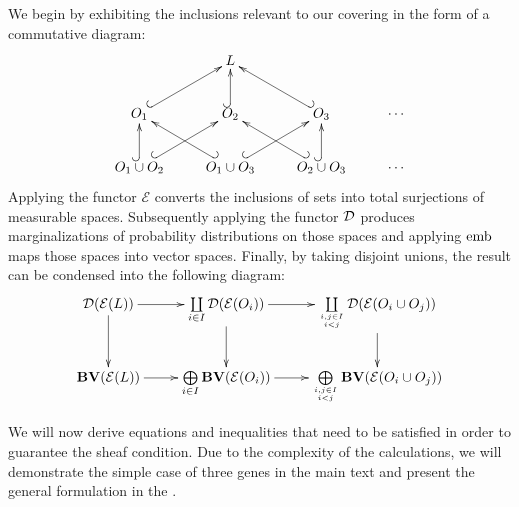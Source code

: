 We begin by exhibiting the inclusions relevant to our covering in the form of a commutative diagram:
\begin{equation*}
\xymatrix{& L & \\
 O_1 \ar@{^{(}->}[ur] &
  O_2 \ar@{^{(}->}[u] &
  O_3 \ar@{_{(}->}[ul] &
  \cdots \\
 O_1 \cup O_2 \ar@{^{(}->}[u] \ar@{^{(}->}[ur] &
  O_1 \cup O_3 \ar@{_{(}->}[ul] \ar@{^{(}->}[ur] &
  O_2 \cup O_3 \ar@{_{(}->}[ul] \ar@{^{(}->}[u] &
  \cdots}
\end{equation*}
Applying the functor $\mathcal{E}$ converts the inclusions of sets into total surjections of measurable spaces.  Subsequently applying the functor $\mathcal{D}$ produces marginalizations of probability distributions on those spaces and applying $\rm{emb}$ maps those spaces into vector spaces.  Finally, by taking disjoint unions, the result can be condensed into the following diagram:
\begin{equation*}
\xymatrix{
 \dist (\mathcal{E}(L)) \ar[r] \ar[d] &
   \ar[d] \coprod\limits_{i \in I} \dist (\mathcal{E}(O_i)) \ar[r] &
  \ar[d] \coprod\limits_{i,j \in I \atop i < j} \dist (\mathcal{E}(O_i \cup O_j)) \\
 \mathbf{BV} (\mathcal{E}(L)) \ar[r]&
  \bigoplus\limits_{i \in I} \mathbf{BV} (\mathcal{E}(O_i)) \ar[r] &
  \bigoplus\limits_{i,j \in I \atop i < j} \mathbf{BV} (\mathcal{E}(O_i \cup O_j))}
\end{equation*}

We will now derive equations and inequalities that need to be satisfied in order to guarantee the sheaf condition.  Due to the complexity of the calculations, we will demonstrate the simple case of three genes in the main text and present the general formulation in the .


